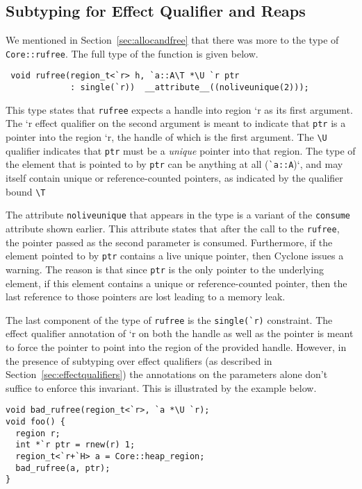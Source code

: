 \subsection{Subtyping for Effect Qualifier and Reaps}
\label{sec:singleconstraint}

We mentioned in Section~\ref{sec:allocandfree} that there was more to
the type of \texttt{Core::rufree}. The full type of the function is
given below.

\begin{verbatim}
 void rufree(region_t<`r> h, `a::A\T *\U `r ptr 
             : single(`r))  __attribute__((noliveunique(2)));
\end{verbatim}

This type states that \verb+rufree+ expects a handle into region `r as
its first argument. The `r effect qualifier on the second argument is
meant to indicate that \texttt{ptr} is a pointer into the region `r,
the handle of which is the first argument. The \verb+\U+ qualifier
indicates that \texttt{ptr} must be a \emph{unique} pointer into that
region. The type of the element that is pointed to by \texttt{ptr} can
be anything at all (\verb+`a::A+)`, and may itself contain unique or
reference-counted pointers, as indicated by the qualifier bound
\verb+\T+

The attribute \verb+noliveunique+ that appears in the type is a
variant of the \verb+consume+ attribute shown earlier. This attribute
states that after the call to the \texttt{rufree}, the pointer passed
as the second parameter is consumed. Furthermore, if the element
pointed to by \texttt{ptr} contains a live unique pointer, then
Cyclone issues a warning. The reason is that since \texttt{ptr} is the
only pointer to the underlying element, if this element contains a
unique or reference-counted pointer, then the last reference to those
pointers are lost leading to a memory leak.

The last component of the type of \texttt{rufree} is the
\verb+single(`r)+ constraint. The effect qualifier annotation of
`r on both the handle as well as the pointer is meant to force the
pointer to point into the region of the provided handle. However, in
the presence of subtyping over effect qualifiers (as described in
Section~\ref{sec:effectqualifiers}) the annotations on the parameters
alone don't suffice to enforce this invariant. This is illustrated by
the example below.

\begin{verbatim}
void bad_rufree(region_t<`r>, `a *\U `r); 
void foo() {
  region r;
  int *`r ptr = rnew(r) 1;
  region_t<`r+`H> a = Core::heap_region;
  bad_rufree(a, ptr);
}
\end{verbatim}


